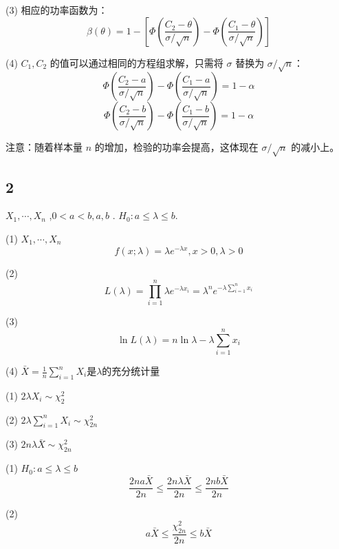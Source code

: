 \documentclass[UTF8]{report}
\theoremstyle{MyLineTheoremStyle} %
\theoremstyle{MyBlockTheoremStyle} %
\theoremstyle{MySubsubsectionStyle} %
\begin{document}
(3) 相应的功率函数为：
$$\beta(\theta)=1-\left[\Phi\left(\frac{C_2-\theta}{\sigma/\sqrt{n}}\right)-\Phi\left(\frac{C_1-\theta}{\sigma/\sqrt{n}}\right)\right]$$

(4) $C_1,C_2$ 的值可以通过相同的方程组求解，只需将 $\sigma$ 替换为 $\sigma/\sqrt{n}$：
$$\Phi\left(\frac{C_2-a}{\sigma/\sqrt{n}}\right)-\Phi\left(\frac{C_1-a}{\sigma/\sqrt{n}}\right)=1-\alpha$$
$$\Phi\left(\frac{C_2-b}{\sigma/\sqrt{n}}\right)-\Phi\left(\frac{C_1-b}{\sigma/\sqrt{n}}\right)=1-\alpha$$

注意：随着样本量 $n$ 的增加，检验的功率会提高，这体现在 $\sigma/\sqrt{n}$ 的减小上。



\subsection{2}
 $X_1,\cdots,X_n$ ,$0<a<b, a,b$ .  $H_0:a\leq\lambda\leq b$. 



(1)  $X_1,\cdots,X_n$ 
\[f(x;\lambda)=\lambda e^{-\lambda x}, x>0, \lambda>0\]

(2) 
\[L(\lambda)=\prod_{i=1}^n \lambda e^{-\lambda x_i}=\lambda^n e^{-\lambda\sum_{i=1}^n x_i}\]

(3) 
\[\ln L(\lambda)=n\ln\lambda-\lambda\sum_{i=1}^n x_i\]

(4) $\bar{X}=\frac{1}{n}\sum_{i=1}^n X_i \text{是} \lambda \text{的充分统计量}$


(1)  $2\lambda X_i \sim \chi^2_2$

(2)  $2\lambda\sum_{i=1}^n X_i \sim \chi^2_{2n}$

(3)  $2n\lambda\bar{X} \sim \chi^2_{2n}$


(1)  $H_0:a\leq\lambda\leq b$
\[\frac{2na\bar{X}}{2n} \leq \frac{2n\lambda\bar{X}}{2n} \leq \frac{2nb\bar{X}}{2n}\]

(2) 
\[a\bar{X} \leq \frac{\chi^2_{2n}}{2n} \leq b\bar{X}\]

\end{document}
